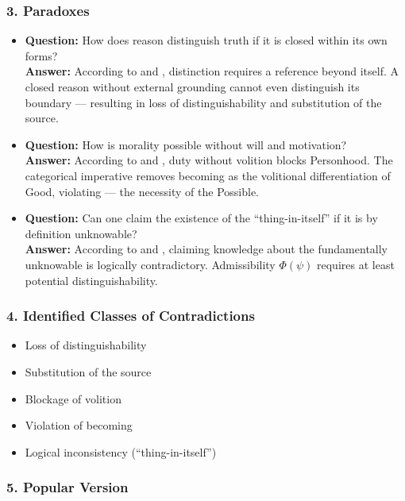 \documentclass[12pt]{article}
\begin{document}
\subsubsection*{3. Paradoxes}

\begin{itemize}
\item \textbf{Question:} How does reason distinguish truth if it is closed within its own forms?  
\\ \textbf{Answer:} According to \text{[1]} and \text{[4.1]}, distinction requires a reference beyond itself. A closed reason without external grounding cannot even distinguish its boundary — resulting in loss of distinguishability and substitution of the source.

\item \textbf{Question:} How is morality possible without will and motivation?  
\\ \textbf{Answer:} According to \text{[12.2]} and \text{[12.3]}, duty without volition blocks Personhood. The categorical imperative removes becoming as the volitional differentiation of Good, violating \text{[3]} — the necessity of the Possible.

\item \textbf{Question:} Can one claim the existence of the ``thing-in-itself'' if it is by definition unknowable?  
\\ \textbf{Answer:} According to \text{[2]} and \text{[11.1]}, claiming knowledge about the fundamentally unknowable is logically contradictory. Admissibility $\Phi(\psi)$ requires at least potential distinguishability.
\end{itemize}

\subsubsection*{4. Identified Classes of Contradictions}

\begin{itemize}
\item Loss of distinguishability
\item Substitution of the source
\item Blockage of volition
\item Violation of becoming
\item Logical inconsistency (``thing-in-itself'')
\end{itemize}

\subsubsection*{5. Popular Version}
\end{document}
